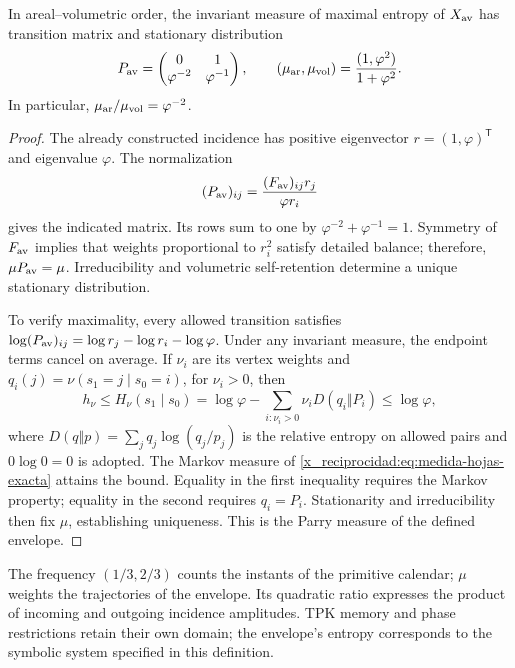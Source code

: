 \begin{proposition}
In areal--volumetric order, the invariant measure of maximal entropy
of \(X_{\rm av}\) has transition matrix and stationary distribution
\begin{equation}
 P_{\rm av}=\begin{pmatrix}0&1\\\varphi^{-2}&\varphi^{-1}\end{pmatrix},
 \qquad
 (\mu_{\rm ar},\mu_{\rm vol})
 =\frac{(1,\varphi^2)}{1+\varphi^2}.
 \label{x_reciprocidad:eq:medida-hojas-exacta}
\end{equation}
In particular, \(\mu_{\rm ar}/\mu_{\rm vol}=\varphi^{-2}\).
\end{proposition}
\begin{proof}
The already constructed incidence has positive eigenvector
\(r=(1,\varphi)^{\mathsf T}\) and eigenvalue \(\varphi\). The
normalization
\[
 (P_{\rm av})_{ij}
 =\frac{(F_{\rm av})_{ij}r_j}{\varphi r_i}
\]
gives the indicated matrix. Its rows sum to one by
\(\varphi^{-2}+\varphi^{-1}=1\). Symmetry of \(F_{\rm av}\)
implies that weights proportional to \(r_i^2\) satisfy detailed
balance; therefore, \(\mu P_{\rm av}=\mu\). Irreducibility and
volumetric self-retention determine a unique stationary distribution.

To verify maximality, every allowed transition satisfies
\(\log(P_{\rm av})_{ij}=\log r_j-\log r_i-\log\varphi\).
Under any invariant measure, the endpoint terms cancel
on average. If \(\nu_i\) are its vertex weights and
\(q_i(j)=\nu(s_1=j\mid s_0=i)\), for \(\nu_i>0\), then
\[
 h_\nu\leq H_\nu(s_1\mid s_0)
 =\log\varphi-\sum_{i:\nu_i>0}\nu_iD(q_i\Vert P_i)
 \leq\log\varphi,
\]
where \(D(q\Vert p)=\sum_jq_j\log(q_j/p_j)\) is the relative
entropy on allowed pairs and \(0\log0=0\) is adopted.
The Markov measure of \eqref{x_reciprocidad:eq:medida-hojas-exacta} attains the bound.
Equality in the first inequality requires the Markov property;
equality in the second requires \(q_i=P_i\). Stationarity and
irreducibility then fix \(\mu\), establishing
uniqueness. This is the Parry measure of the defined envelope.
\end{proof}

The frequency \((1/3,2/3)\) counts the instants of the primitive calendar;
\(\mu\) weights the trajectories of the envelope. Its quadratic ratio
expresses the product of incoming and outgoing incidence amplitudes.
TPK memory and phase restrictions retain their own
domain; the envelope's entropy corresponds to the symbolic system
specified in this definition.

